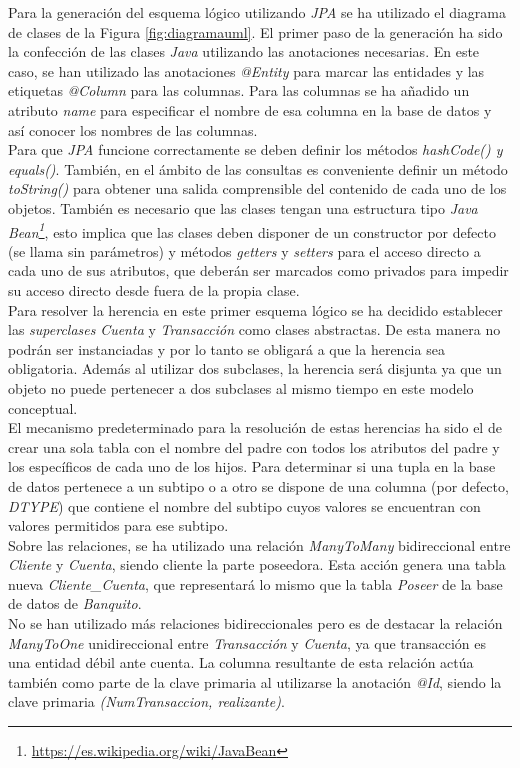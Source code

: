 \documentclass[11pt,a4paper]{article}
\begin{document}
Para la generación del esquema lógico utilizando \emph{JPA} se ha  utilizado el diagrama de clases de la Figura \ref{fig:diagramauml}. El primer paso de la generación ha sido la confección de las clases \emph{Java} utilizando las anotaciones necesarias. En este caso, se han utilizado las anotaciones \emph{@Entity} para marcar las entidades y las etiquetas \emph{@Column} para las columnas. Para las columnas se ha añadido un atributo \emph{name} para especificar el nombre de esa columna en la base de datos y así conocer los nombres de las columnas.\\
Para que \emph{JPA} funcione correctamente se deben definir los métodos \emph{hashCode() y equals()}. También, en el ámbito de las consultas es conveniente definir un método \emph{toString()} para obtener una salida comprensible del contenido de cada uno de los objetos. También es necesario que las clases tengan una estructura tipo \emph{Java Bean\footnote{\url{https://es.wikipedia.org/wiki/JavaBean}}}, esto implica que las clases deben disponer de un constructor por defecto (se llama sin parámetros) y métodos \emph{getters} y \emph{setters} para el acceso directo a cada uno de sus atributos, que deberán ser marcados como privados para impedir su acceso directo desde fuera de la propia clase.\\
Para resolver la herencia en este primer esquema lógico se ha decidido establecer las \emph{superclases} \emph{Cuenta} y \emph{Transacción} como clases abstractas. De esta manera no podrán ser instanciadas y por lo tanto se obligará a que la herencia sea obligatoria. Además al utilizar dos subclases, la herencia será disjunta ya que un objeto no puede pertenecer a dos subclases al mismo tiempo en este modelo conceptual.\\
El mecanismo predeterminado para la resolución de estas herencias ha sido el de crear una sola tabla con el nombre del padre con todos los atributos del padre y los específicos de cada uno de los hijos. Para determinar si una tupla en la base de datos pertenece a un subtipo o a otro se dispone de una columna (por defecto, \emph{DTYPE}) que contiene el nombre del subtipo cuyos valores se encuentran con valores permitidos para ese subtipo.\\
Sobre las relaciones, se ha utilizado una relación \emph{ManyToMany} bidireccional entre \emph{Cliente} y \emph{Cuenta}, siendo cliente la parte poseedora. Esta acción genera una tabla nueva \emph{Cliente\_{}Cuenta}, que representará lo mismo que la tabla \emph{Poseer} de la base de datos de \emph{Banquito}.\\
No se han utilizado más relaciones bidireccionales pero es de destacar la relación \emph{ManyToOne} unidireccional entre \emph{Transacción} y \emph{Cuenta}, ya que transacción es una entidad débil ante cuenta. La columna resultante de esta relación actúa también como parte de la clave primaria al utilizarse la anotación \emph{@Id}, siendo la clave primaria \emph{(NumTransaccion, realizante)}.\\
\end{document}
